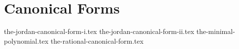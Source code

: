 \chapter{Canonical Forms}
{the-jordan-canonical-form-i.tex}
{the-jordan-canonical-form-ii.tex}
{the-minimal-polynomial.tex}
{the-rational-canonical-form.tex}
